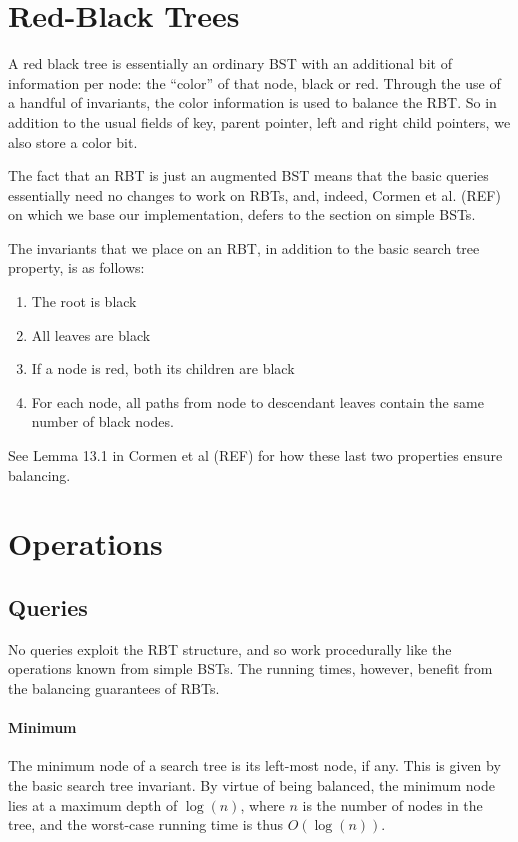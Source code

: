 \documentclass[oneside,11pt,openright]{report}
\begin{document}
\section{Red-Black Trees}\label{sec:rbt}

A red black tree is essentially an ordinary BST with an additional bit
of information per node: the ``color'' of that node, black or
red. Through the use of a handful of invariants, the color information
is used to balance the RBT. So in addition to the usual fields of key,
parent pointer, left and right child pointers, we also store a color
bit.

The fact that an RBT is just an augmented BST means that the basic
queries essentially need no changes to work on RBTs, and, indeed,
Cormen et al. (REF) on which we base our implementation, defers to the
section on simple BSTs.

The invariants that we place on an RBT, in addition to the basic
search tree property, is as follows:

\begin{enumerate}
  \item The root is black
  \item All leaves are black
  \item If a node is red, both its children are black
  \item For each node, all paths from node to descendant leaves
    contain the same number of black nodes.
\end{enumerate}

See Lemma 13.1 in Cormen et al (REF) for how these last two properties
ensure balancing.

\section{Operations}

\subsection{Queries}

No queries exploit the RBT structure, and so work procedurally like the
operations known from simple BSTs. The running times, however, benefit
from the balancing guarantees of RBTs.

\paragraph{Minimum} The minimum node of a search tree is its left-most
node, if any. This is given by the basic search tree invariant. By
virtue of being balanced, the minimum node lies at a maximum depth of
$\log(n)$, where $n$ is the number of nodes in the tree, and the
worst-case running time is thus $O(\log(n))$.
\end{document}
